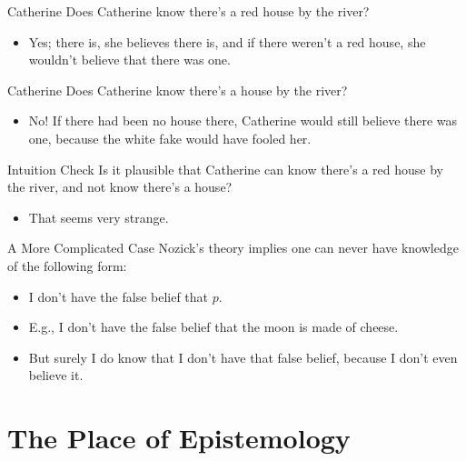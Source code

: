 \documentclass[
  17pt,
  letterpaper,
  ignorenonframetext,
  aspectratio=169,
]{beamer}
\providecommand{\tightlist}{%
  \setlength{\itemsep}{0pt}\setlength{\parskip}{0pt}}\usepackage{longtable,booktabs,array}
\begin{document}
\begin{frame}{Catherine}
\protect\hypertarget{catherine}{}
Does Catherine know there's a red house by the river?

\begin{itemize}[<+->]
\tightlist
\item
  Yes; there is, she believes there is, and if there weren't a red
  house, she wouldn't believe that there was one.
\end{itemize}
\end{frame}

\begin{frame}{Catherine}
\protect\hypertarget{catherine-1}{}
Does Catherine know there's a house by the river?

\begin{itemize}[<+->]
\tightlist
\item
  No! If there had been no house there, Catherine would still believe
  there was one, because the white fake would have fooled her.
\end{itemize}
\end{frame}

\begin{frame}{Intuition Check}
\protect\hypertarget{intuition-check}{}
Is it plausible that Catherine can know there's a red house by the
river, and not know there's a house?

\begin{itemize}[<+->]
\tightlist
\item
  That seems very strange.
\end{itemize}
\end{frame}

\begin{frame}{A More Complicated Case}
\protect\hypertarget{a-more-complicated-case}{}
Nozick's theory implies one can never have knowledge of the following
form:

\begin{itemize}[<+->]
\tightlist
\item
  I don't have the false belief that \(p\).
\item
  E.g., I don't have the false belief that the moon is made of cheese.
\item
  But surely I do know that I don't have that false belief, because I
  don't even believe it.
\end{itemize}
\end{frame}

\hypertarget{the-place-of-epistemology}{%
\section{The Place of Epistemology}\label{the-place-of-epistemology}}
\end{document}
